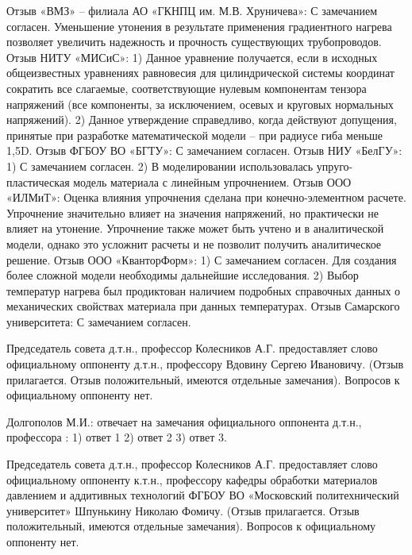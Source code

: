 Отзыв «ВМЗ» – филиала АО «ГКНПЦ им. М.В. Хруничева»:
С замечанием согласен. Уменьшение утонения в результате применения градиентного нагрева позволяет увеличить надежность и прочность существующих трубопроводов.
Отзыв НИТУ «МИСиС»:
1) Данное уравнение получается, если в исходных общеизвестных уравнениях равновесия для цилиндрической системы координат сократить все слагаемые, соответствующие нулевым компонентам тензора напряжений (все компоненты, за исключением, осевых и круговых нормальных напряжений).
2) Данное утверждение справедливо, когда действуют допущения, принятые при разработке математической модели – при радиусе гиба меньше 1,5D.
Отзыв ФГБОУ ВО «БГТУ»:
С замечанием согласен.
Отзыв НИУ «БелГУ»:
1) С замечанием согласен.
2) В моделировании использовалась упруго-пластическая модель материала с линейным упрочнением.
Отзыв ООО «ИЛМиТ»:
Оценка влияния упрочнения сделана при конечно-элементном расчете. Упрочнение значительно влияет на значения напряжений, но практически не влияет на утонение. Упрочнение также может быть учтено и в аналитической модели, однако это усложнит расчеты и не позволит получить аналитическое решение.
Отзыв ООО «КванторФорм»:
1) С замечанием согласен. Для создания более сложной модели необходимы дальнейшие исследования.
2) Выбор температур нагрева был продиктован наличием подробных справочных данных о механических свойствах материала при данных температурах.
Отзыв Самарского университета:
С замечанием согласен.

Председатель совета д.т.н., профессор Колесников А.Г. предоставляет слово официальному оппоненту д.т.н., профессору Вдовину Сергею Ивановичу. (Отзыв прилагается. Отзыв положительный, имеются отдельные замечания).
Вопросов к официальному оппоненту нет.

Долгополов М.И.: отвечает на замечания официального оппонента д.т.н., профессора \opponentOneWhomFioShort:
1) ответ 1
2) ответ 2
3) ответ 3.

Председатель совета д.т.н., профессор Колесников А.Г. предоставляет слово официальному оппоненту к.т.н., профессору кафедры обработки материалов давлением и аддитивных технологий ФГБОУ ВО «Московский политехнический университет» Шпунькину Николаю Фомичу. (Отзыв прилагается. Отзыв положительный, имеются отдельные замечания).
Вопросов к официальному оппоненту нет.

